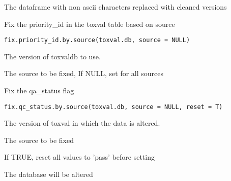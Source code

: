 \documentclass[letterpaper]{book}
\begin{document}
%
\begin{Value}
The dataframe with non ascii characters replaced with cleaned versions
\end{Value}
%
\begin{Description}\relax
Fix the priority\_id in the toxval table based on source
\end{Description}
%
\begin{Usage}
\begin{verbatim}
fix.priority_id.by.source(toxval.db, source = NULL)
\end{verbatim}
\end{Usage}
%
\begin{Arguments}
\begin{ldescription}
\item[\code{toxval.db}] The version of toxvaldb to use.

\item[\code{source}] The source to be fixed, If NULL, set for all sources
\end{ldescription}
\end{Arguments}
%
\begin{Description}\relax
Fix the qa\_status flag
\end{Description}
%
\begin{Usage}
\begin{verbatim}
fix.qc_status.by.source(toxval.db, source = NULL, reset = T)
\end{verbatim}
\end{Usage}
%
\begin{Arguments}
\begin{ldescription}
\item[\code{toxval.db}] The version of toxval in which the data is altered.

\item[\code{source}] The source to be fixed

\item[\code{reset}] If TRUE, reset all values to 'pass' before setting
\end{ldescription}
\end{Arguments}
%
\begin{Value}
The database will be altered
\end{Value}
\end{document}
